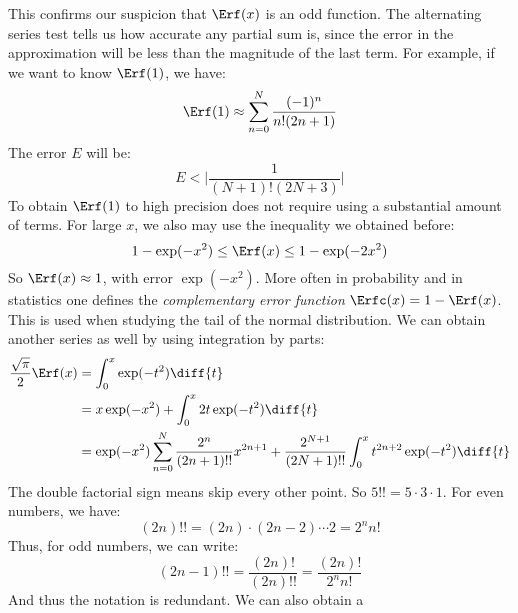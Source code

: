 \documentclass[crop=false,class=book,oneside]{standalone}
\begin{document}
        This confirms our suspicion that $\Erf(x)$ is an
        odd function. The alternating series test tells us how
        accurate any partial sum is, since the error in the
        approximation will be less than the magnitude of the
        last term. For example, if we want to know $\Erf(1)$,
        we have:
        \begin{equation}
            \Erf(1)\approx
                \sum_{n=0}^{N}\frac{(-1)^{n}}{n!(2n+1)}
        \end{equation}
        The error $E$ will be:
        \begin{equation}
            E<\Big|\frac{1}{(N+1)!(2N+3)}\Big|
        \end{equation}
        To obtain $\Erf(1)$ to high precision does not require
        using a substantial amount of terms. For large $x$,
        we also may use the inequality we obtained before:
        \begin{equation}
            1-\exp(-x^{2})\leq\Erf(x)\leq1-\exp(-2x^{2})
        \end{equation}
        So $\Erf(x)\approx{1}$, with error $\exp(-x^{2})$.
        More often in probability and in statistics one defines
        the \textit{complementary error function}
        $\Erfc(x)=1-\Erf(x)$. This is used when studying the
        tail of the normal distribution. We can obtain another
        series as well by using integration by parts:
        \begin{align}
            \frac{\sqrt{\pi}}{2}\Erf(x)
            &=\int_{0}^{x}\exp(-t^{2})\diff{t}\\
            &=x\exp(-x^{2})+\int_{0}^{x}2t\exp(-t^{2})\diff{t}\\
            &=\exp(-x^{2})\sum_{n=0}^{N}
                \frac{2^{n}}{(2n+1)!!}x^{2n+1}
            +\frac{2^{N+1}}{(2N+1)!!}
            \int_{0}^{x}t^{2n+2}\exp(-t^{2})\diff{t}
        \end{align}
        The double factorial sign means skip every other point.
        So $5!!=5\cdot{3}\cdot{1}$. For even numbers, we have:
        \begin{equation}
            (2n)!!=(2n)\cdot(2n-2)\cdots{2}
            =2^{n}n!
        \end{equation}
        Thus, for odd numbers, we can write:
        \begin{equation}
            (2n-1)!!=\frac{(2n)!}{(2n)!!}
            =\frac{(2n)!}{2^{n}n!}
        \end{equation}
        And thus the notation is redundant. We can also obtain a
\end{document}
